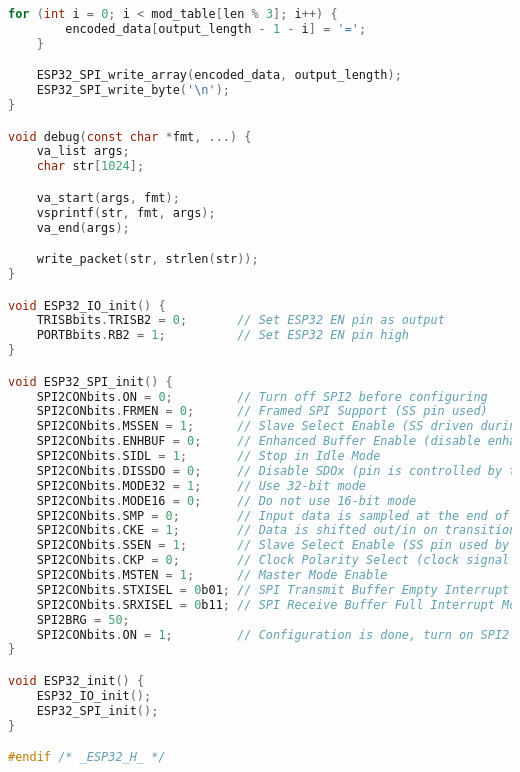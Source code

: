 \begin{lstlisting}[language=C]
    for (int i = 0; i < mod_table[len % 3]; i++) {
        encoded_data[output_length - 1 - i] = '=';
    }

    ESP32_SPI_write_array(encoded_data, output_length);
    ESP32_SPI_write_byte('\n');
}

void debug(const char *fmt, ...) {
    va_list args;
    char str[1024];

    va_start(args, fmt);
    vsprintf(str, fmt, args);
    va_end(args);

    write_packet(str, strlen(str));
}

void ESP32_IO_init() {
    TRISBbits.TRISB2 = 0;       // Set ESP32 EN pin as output
    PORTBbits.RB2 = 1;          // Set ESP32 EN pin high
}

void ESP32_SPI_init() {
    SPI2CONbits.ON = 0;         // Turn off SPI2 before configuring
    SPI2CONbits.FRMEN = 0;      // Framed SPI Support (SS pin used)
    SPI2CONbits.MSSEN = 1;      // Slave Select Enable (SS driven during transmission)
    SPI2CONbits.ENHBUF = 0;     // Enhanced Buffer Enable (disable enhanced buffer)
    SPI2CONbits.SIDL = 1;       // Stop in Idle Mode
    SPI2CONbits.DISSDO = 0;     // Disable SDOx (pin is controlled by this module)
    SPI2CONbits.MODE32 = 1;     // Use 32-bit mode
    SPI2CONbits.MODE16 = 0;     // Do not use 16-bit mode
    SPI2CONbits.SMP = 0;        // Input data is sampled at the end of the clock signal
    SPI2CONbits.CKE = 1;        // Data is shifted out/in on transition from idle (high) state to active (low) state
    SPI2CONbits.SSEN = 1;       // Slave Select Enable (SS pin used by module)
    SPI2CONbits.CKP = 0;        // Clock Polarity Select (clock signal is active low, idle state is high)
    SPI2CONbits.MSTEN = 1;      // Master Mode Enable
    SPI2CONbits.STXISEL = 0b01; // SPI Transmit Buffer Empty Interrupt Mode (generated when the buffer is completely empty)
    SPI2CONbits.SRXISEL = 0b11; // SPI Receive Buffer Full Interrupt Mode (generated when the buffer is full)
    SPI2BRG = 50;
    SPI2CONbits.ON = 1;         // Configuration is done, turn on SPI2 peripheral
}

void ESP32_init() {
    ESP32_IO_init();
    ESP32_SPI_init();
}

#endif /* _ESP32_H_ */
\end{lstlisting}


